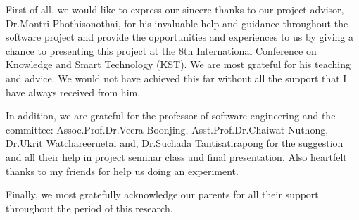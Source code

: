 \cleardoublepage


\begin{acknowledgements}

\hspace{1.5cm}First of all, we  would like to express our sincere thanks to our project advisor, Dr.Montri Phothisonothai, for his invaluable help and guidance throughout the software project and  provide the opportunities and experiences to us by giving a chance to presenting this project at the 8th International Conference on Knowledge and Smart Technology (KST). We are most grateful for his teaching and advice. We would not have achieved this far without all the support that I have always received from him.

\hspace{1.5cm}In addition, we are grateful for the professor of software engineering and the committee: 
Assoc.Prof.Dr.Veera Boonjing, 
Asst.Prof.Dr.Chaiwat Nuthong, 
Dr.Ukrit Watchareeruetai and,  
Dr.Suchada Tantisatirapong
for the suggestion and all their help in project seminar class and final presentation. 
Also heartfelt thanks to my friends for help us doing an experiment.

\hspace{1.5cm}Finally, we most gratefully acknowledge our parents for all their support throughout the period of this research.

\end{acknowledgements}